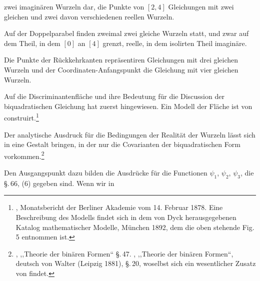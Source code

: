 zwei imaginären Wurzeln dar, die Punkte von $[2, 4]$ Gleichungen mit zwei gleichen und zwei davon verschiedenen reellen Wurzeln.

Auf der Doppelparabel finden zweimal zwei gleiche Wurzeln statt, und zwar auf dem Theil, in dem $[0]$ an $[4]$ grenzt, reelle, in dem isolirten Theil imaginäre.


Die Punkte der Rückkehrkanten repräsentiren Gleichungen mit drei gleichen Wurzeln und der Coordinaten-Anfangspunkt die Gleichung mit vier gleichen Wurzeln.

Auf die Discriminantenfläche und ihre Bedeutung für die Discussion der biquadratischen Gleichung hat zuerst  hingewiesen. Ein Modell der Fläche ist von  construirt.\footnote{, Monatsbericht der Berliner Akademie vom 14. Februar 1878. Eine Beschreibung des Modells findet sich in dem von Dyck herausgegebenen Katalog mathematischer Modelle, München 1892, dem die oben stehende Fig. 5 entnommen ist.}

Der analytische Ausdruck für die Bedingungen der Realität der Wurzeln lässt sich in eine Gestalt bringen, in der nur die Covarianten der biquadratischen Form vorkommen.\footnote{, ,,Theorie der binären Formen`` \S.\,47. , ,,Theorie der binären Formen``, deutsch von Walter (Leipzig 1881), \S.\,20, woselbst sich ein wesentlicher Zusatz von  findet.}

Den Ausgangspunkt dazu bilden die Ausdrücke für die Functionen $\psi_1$, $\psi_2$, $\psi_3$, die \S.\,66, (6) gegeben sind. Wenn wir in
